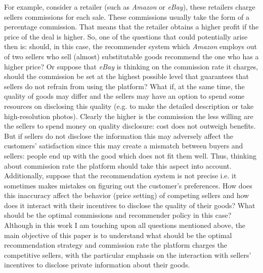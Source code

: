 \documentclass[a4paper]{article}
\begin{document}
For example, consider a retailer (such as \textit{Amazon} or \textit{eBay}), these retailers charge sellers commissions for each sale. These commissions usually take the form of a percentage commission. That means that the retailer obtains a higher profit if the price of the deal is higher. So, one of the questions that could potentially arise then is: should, in this case, the recommender system which \textit{Amazon} employs out of two sellers who sell (almost) substitutable goods recommend the one who has a higher price? Or suppose that \textit{eBay} is thinking on the commission rate it charges, %
 should the commission be set at the highest possible level that guarantees that sellers do not refrain from using the platform? What if, at the same time, the quality of goods may differ and the sellers may have an option to spend some resources on disclosing this quality (e.g. to make the detailed description or take high-resolution photos). Clearly the higher is the commission the less willing are the sellers to spend money on quality disclosure: cost does not outweigh benefits. But if sellers do not disclose the information this may adversely affect the customers' satisfaction since this may create a mismatch between buyers and sellers: people end up with the good which does not fit them well. Thus, thinking about commission rate the platform should take this aspect into account. Additionally, suppose that the recommendation system is not precise i.e. it sometimes makes mistakes on figuring out the customer's preferences. How does this inaccuracy affect the behavior (price setting) of competing sellers and how does it interact with their incentives to disclose the quality of their goods? What should be the optimal commissions and recommender policy in this case? Although in this work I am touching upon all questions mentioned above, the main objective of this paper is to understand what should be the optimal recommendation strategy and commission rate the platform charges the competitive sellers, with the particular emphasis on the interaction with sellers' incentives to disclose private information about their goods. 
 
	
	
\end{document}
